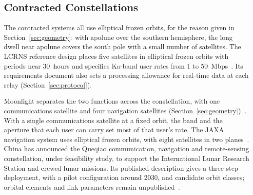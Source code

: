 \documentclass{IEEEoj}
\begin{document}
\subsection{Contracted Constellations}
The contracted systems all use elliptical frozen orbits, for the reason given in Section~\ref{sec:geometry}: with apolune over the southern hemisphere, the long dwell near apolune covers the south pole with a small number of satellites. The LCRNS reference design places five satellites in elliptical frozen orbits with periods near \SI{30}{hours} and specifies Ka-band user rates from \SI{1}{} to \SI{50}{Mbps}~\cite{lcrns_ref_const,nasa_lunar_relay_srd}. Its requirements document also sets a processing allowance for real-time data at each relay (Section~\ref{sec:protocol}).

Moonlight separates the two functions across the constellation, with one communications satellite and four navigation satellites (Section~\ref{sec:geometry})~\cite{esa_moonlight_overview,telespazio_moonlight}. With a single communications satellite at a fixed orbit, the band and the aperture that each user can carry set most of that user's rate. The JAXA navigation system uses elliptical frozen orbits, with eight satellites in two planes~\cite{jaxa_lnss}. China has announced the Queqiao communication, navigation and remote-sensing constellation, under feasibility study, to support the International Lunar Research Station and crewed lunar missions. Its published description gives a three-step deployment, with a pilot configuration around 2030, and candidate orbit classes; orbital elements and link parameters remain unpublished~\cite{ilrs_relay_constellation}.
\end{document}
